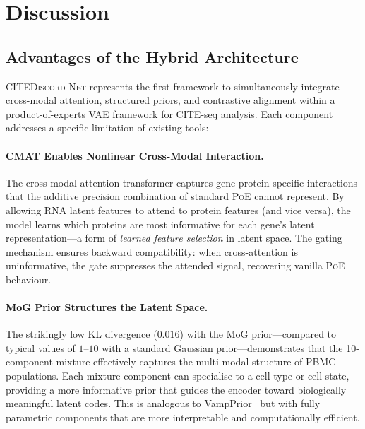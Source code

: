 \documentclass[11pt,a4paper]{article}
\newcommand{\poe}{\textsc{PoE}}
\newcommand{\citenet}{\textsc{CITEDiscord-Net}}
\begin{document}
\section{Discussion}\label{sec:discussion}

\subsection{Advantages of the Hybrid Architecture}

\citenet{} represents the first framework to simultaneously integrate cross-modal attention, structured priors, and contrastive alignment within a product-of-experts VAE framework for CITE-seq analysis.
Each component addresses a specific limitation of existing tools:

\paragraph{CMAT Enables Nonlinear Cross-Modal Interaction.}
The cross-modal attention transformer captures gene-protein-specific interactions that the additive precision combination of standard \poe{} cannot represent.
By allowing RNA latent features to attend to protein features (and vice versa), the model learns which proteins are most informative for each gene's latent representation---a form of \emph{learned feature selection} in latent space.
The gating mechanism ensures backward compatibility: when cross-attention is uninformative, the gate suppresses the attended signal, recovering vanilla \poe{} behaviour.

\paragraph{MoG Prior Structures the Latent Space.}
The strikingly low KL divergence ($0.016$) with the MoG prior---compared to typical values of $1$--$10$ with a standard Gaussian prior---demonstrates that the 10-component mixture effectively captures the multi-modal structure of PBMC populations.
Each mixture component can specialise to a cell type or cell state, providing a more informative prior that guides the encoder toward biologically meaningful latent codes.
This is analogous to VampPrior~\citep{tomczak2018} but with fully parametric components that are more interpretable and computationally efficient.
\end{document}
